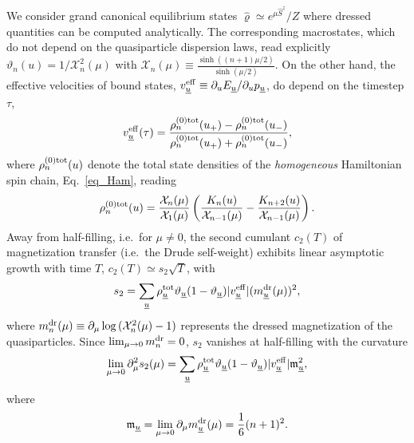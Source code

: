 \documentclass[
twocolumn,
amsfonts,
showpacs,
superscriptaddress,
amsmath,
amssymb,
aps,
longbibliography,
prl,
noeprint
]{revtex4-2}
\newcommand{\ch}[1]{{\color{black}  #1}}
\newcommand{\veff}{v^\eff}
\newcommand{\1}{{\bf 1}}
\newcommand{\eff}{{\rm eff}}
\begin{document}
We consider grand canonical equilibrium states $\hat{\varrho}\simeq e^{\mu \hat{S}^{z}}/Z$ \ch{where dressed quantities can be computed analytically}. The corresponding macrostates, which do not depend on the quasiparticle dispersion laws, read explicitly $\vartheta_{n}(u)=1/\mathcal{X}^{2}_{n}(\mu)$ with $\mathcal{X}_{n}(\mu) \equiv \frac{\sinh{((n+1)\mu/2)}}{\sinh{(\mu/2)}}$. On the other hand, the effective velocities of bound states, $v^{\rm eff}_{\underline{u}}\equiv \partial_{u} E_{\underline{u}}/\partial_{u} p_{\underline{u}}$, do depend on the timestep $\tau$,
\begin{equation}
    v^{\rm eff}_{\underline{u}}(\tau) = \frac{\rho^{(0)\rm tot}_{n}(u_{+})-\rho^{(0)\rm tot}_{n}(u_{-})}{\rho^{(0)\rm tot}_{n}(u_{+})+\rho^{(0)\rm tot}_{n}(u_{-})},
\end{equation}
where $\rho^{(0)\rm tot}_{n}(u)$ denote the total state densities of the \emph{homogeneous} Hamiltonian spin chain, Eq.~\eqref{eq_Ham}, reading
\begin{equation}
    \rho^{(0)\rm tot}_{n}(u) = \frac{\mathcal{X}_{n}(\mu)}{\mathcal{X}_{1}(\mu)}
    \left(\frac{K_{n}(u)}{\mathcal{X}_{n-1}(\mu)}-\frac{K_{n+2}(u)}{\mathcal{X}_{n-1}(\mu)}\right).
\end{equation}
Away from half-filling, i.e.~for $\mu\neq 0$, the second cumulant $c_{2}(T)$ of magnetization transfer (i.e.~the Drude self-weight) exhibits linear asymptotic growth with time $T$, $c_{2}(T)\simeq s_{2}\sqrt{T}$, with
\begin{equation}
    s_{2} = \sum_{\underline{u}}\rho^{\rm tot}_{\underline{u}}\vartheta_{\underline{u}}(1-\vartheta_{\underline{u}})|\veff_{\underline{u}}|(m^{\rm dr}_{\underline{u}}(\mu))^{2},
\end{equation}
where $m^{\rm dr}_{n}(\mu) \equiv \partial_{\mu}\log{(\mathcal{X}^{2}_{n}(\mu)-1)}$ represents the dressed magnetization of the quasiparticles. Since $\lim_{\mu \to 0}m^{\rm dr}_{n}=0$, $s_{2}$ vanishes at half-filling with the curvature
\begin{equation}
    \lim_{\mu\to 0}\partial^{2}_{\mu}s_{2}(\mu) = \sum_{\underline{u}}\rho^{\rm tot}_{\underline{u}}\vartheta_{\underline{u}}(1-\vartheta_{\underline{u}})|\veff_{\underline{u}}|\mathfrak{m}_{\underline{u}}^{2},
\end{equation}
where
\begin{equation}\label{eqn:frakm}
    \mathfrak{m}_{\underline{u}}=\lim_{\mu \to 0}\partial_{\mu}m^{\rm dr}_{\underline{u}}(\mu)=\frac{1}{6}(n+1)^{2}.
\end{equation}
\end{document}
